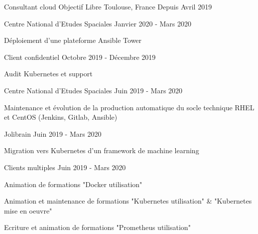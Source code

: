 

\begin{cventries}

  \cventry
    {Consultant cloud} %
    {Objectif Libre} %
    {Toulouse, France} %
    {Depuis Avril 2019} %
    {
      \begin{cvsubentries}
        \cvsubentry
          {}
          {Centre National d'Etudes Spaciales}
          {Janvier 2020 - Mars 2020}
          {
            \begin{cvitems} %
              \item {Déploiement d'une plateforme Ansible Tower}
            \end{cvitems}
          }
        \cvsubentry
          {}
          {Client confidentiel}
          {Octobre 2019 - Décembre 2019}
          {
            \begin{cvitems} %
              \item {Audit Kubernetes et support}
            \end{cvitems}
          }
        \cvsubentry
          {}
          {Centre National d'Etudes Spaciales}
          {Juin 2019 - Mars 2020}
          {
            \begin{cvitems} %
              \item {Maintenance et évolution de la production automatique du socle technique RHEL et CentOS (Jenkins, Gitlab, Ansible)}
            \end{cvitems}
          }
        \cvsubentry
          {}
          {Jolibrain}
          {Juin 2019 - Mars 2020}
          {
            \begin{cvitems} %
              \item {Migration vers Kubernetes d'un framework de machine learning}
            \end{cvitems}
          }
        \cvsubentry
          {}
          {Clients multiples}
          {Juin 2019 - Mars 2020}
          {
            \begin{cvitems} %
              \item {Animation de formations "Docker utilisation"}
              \item {Animation et maintenance de formations "Kubernetes utilisation" \& "Kubernetes mise en oeuvre"}
              \item {Ecriture et animation de formations "Prometheus utilisation"}
            \end{cvitems}
          }
      \end{cvsubentries}
    }


\end{cventries}
